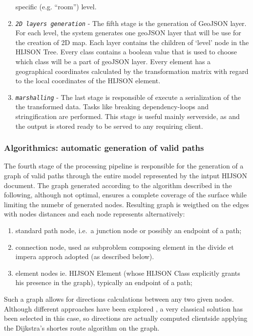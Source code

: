 \documentclass{sig-alternate}
\begin{document}
\begin{enumerate}
  specific (e.g. ``room'') level.
\item
  \textit{\texttt{2D layers generation}} - The fifth stage is the
  generation of GeoJSON layer. For each level, the system generates one
  geoJSON layer that will be use for the creation of 2D map. Each layer
  contains the children of `level' node in the HIJSON Tree. Every class
  contains a boolean value that is used to choose which class will be a
  part of geoJSON layer. Every element has a geographical coordinates
  calculated by the transformation matrix with regard to the local
  coordinates of the HIJSON element.
\item
  \textit{\texttt{marshalling}} - The last stage is responsible of execute
  a serialization of the the transformed data. Tasks like breaking
  dependency-loops and stringification are performed. This stage is
  useful mainly serverside, as and the output is stored ready to be
  served to any requiring client.
\end{enumerate}

\subsubsection{Algorithmics: automatic generation of valid paths}\label{algorithmics-automatic-generation-of-valid-paths}

The fourth stage of the processing pipeline is responsible for the
generation of a graph of valid paths through the entire model
represented by the intput HIJSON document. The graph generated according
to the algorithm described in the following, although not optimal,
ensures a complete coverage of the surface while limiting the numebr of
generated nodes. Resulting graph is weigthed on the edges with nodes
distances and each node represents alternatively:

\begin{enumerate}
\def\labelenumi{\alph{enumi}.}
\itemsep1pt\parskip0pt
\item
  standard path node, i.e.~a junction node or possibly an endpoint of a
  path;
\item
  connection node, used as subproblem composing element in the divide et
  impera approch adopted (as described below).
\item
  element nodes ie. HIJSON Element (whose HIJSON Class explicitly grants
  his presence in the graph), typically an endpoint of a path;
\end{enumerate}

Such a graph allows for directions calculations between any two given
nodes. Although different approaches have been explored \cite{6999103}, 
a very classical solution has been selected in this case, so directions 
are actually computed clientside applying the Dijkstra's shortes route 
algorithm on the graph. 
\end{document}
